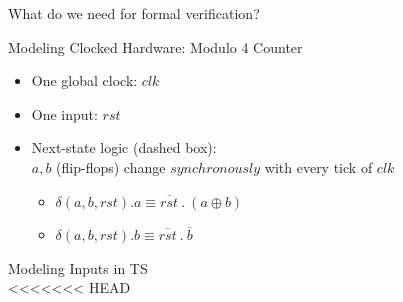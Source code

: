 \documentclass{beamer}
\begin{document}
\begin{frame}{What do we need for formal verification?}
\begin{frame}{Modeling Clocked Hardware: Modulo 4 Counter}
\begin{itemize}
\item One global clock: $clk$ \\

\item One input: $rst$

\item Next-state logic (dashed box): \\
$a, b$ (flip-flops) change $synchronously$ with every tick of $clk$
\begin{itemize}
\item $\delta(a, b, rst).a \equiv \overline{rst}~.~(a \oplus b)$
\item $\delta(a, b, rst).b \equiv \overline{rst}~.~\overline{b}$
\end{itemize}


\end{itemize}
\end{frame}

\begin{frame}{Modeling Inputs in TS}
\hfill
{} \\
<<<<<<< HEAD
\hfill 
{}
\end{frame}


\end{frame}
\end{document}
